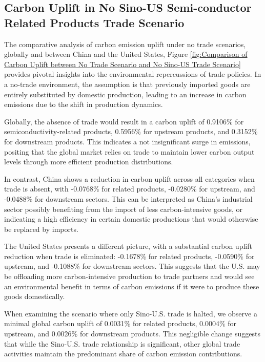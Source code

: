 \subsection{Carbon Uplift in No Sino-US Semi-conductor Related Products Trade Scenario}


The comparative analysis of carbon emission uplift under no trade scenarios, globally and between China and the United States, Figure \ref{fig:Comparison of Carbon Uplift between No Trade Scenario and No Sino-US Trade Scenario} provides pivotal insights into the environmental repercussions of trade policies. In a no-trade environment, the assumption is that previously imported goods are entirely substituted by domestic production, leading to an increase in carbon emissions due to the shift in production dynamics.

Globally, the absence of trade would result in a carbon uplift of 0.9106\% for semiconductivity-related products, 0.5956\% for upstream products, and 0.3152\% for downstream products. This indicates a not insignificant surge in emissions, positing that the global market relies on trade to maintain lower carbon output levels through more efficient production distributions.

In contrast, China shows a reduction in carbon uplift across all categories when trade is absent, with -0.0768\% for related products, -0.0280\% for upstream, and -0.0488\% for downstream sectors. This can be interpreted as China's industrial sector possibly benefiting from the import of less carbon-intensive goods, or indicating a high efficiency in certain domestic productions that would otherwise be replaced by imports.

The United States presents a different picture, with a substantial carbon uplift reduction when trade is eliminated: -0.1678\% for related products, -0.0590\% for upstream, and -0.1088\% for downstream sectors. This suggests that the U.S. may be offloading more carbon-intensive production to trade partners and would see an environmental benefit in terms of carbon emissions if it were to produce these goods domestically.

When examining the scenario where only Sino-U.S. trade is halted, we observe a minimal global carbon uplift of 0.0031\% for related products, 0.0004\% for upstream, and 0.0026\% for downstream products. This negligible change suggests that while the Sino-U.S. trade relationship is significant, other global trade activities maintain the predominant share of carbon emission contributions.

